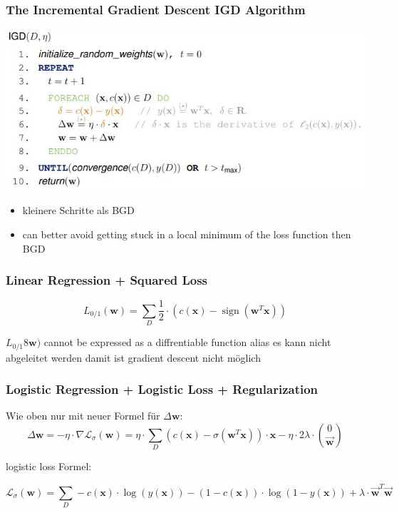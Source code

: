 \documentclass[11pt,a4paper]{article}
\DeclareMathOperator*{\sign}{sign}
\begin{document}
\begin{flushleft}
\subsubsection{The Incremental Gradient Descent IGD Algorithm}
\includegraphics[width=\textwidth]{IGD}
\begin{itemize}
\item kleinere Schritte als BGD
\item  can better avoid getting stuck in a local minimum of the loss function then BGD
\end{itemize}
\subsubsection{Linear Regression + Squared Loss}
$$ L_{0/1}(\textbf{w}) = \displaystyle\sum_D \dfrac{1}{2} \cdot (c(\textbf{x})  - \sign (\textbf{w}^T \textbf{x} )) $$

$L_{0/1}8\textbf{w})$ cannot be expressed as a diffrentiable function alias es kann nicht abgeleitet werden damit ist gradient descent nicht möglich

\subsubsection{Logistic Regression + Logistic Loss + Regularization}
Wie oben nur mit neuer Formel für $\Delta \textbf{w}$:
$$ \Delta\textbf{w} = - \eta \cdot \nabla \mathcal{L}_\sigma (\textbf{w}) = 
\eta \cdot \displaystyle\sum_D (c(\textbf{x}) - \sigma (\textbf{w}^T\textbf{x}))\cdot \textbf{x} - \eta \cdot 2 \lambda \cdot \binom{0}{\overrightarrow{\textbf{w}}} $$

logistic loss Formel:

$$ \mathcal{L}_\sigma (\textbf{w} ) = \displaystyle\sum_D -c(\textbf{x}) \cdot \log(y(\textbf{x}))- (1 - c(\textbf{x}) ) \cdot \log (1 - y (\textbf{x} )) + \lambda \cdot \overrightarrow{\textbf{w}}^T \overrightarrow{\textbf{w}}  $$


\end{flushleft}
\end{document}
